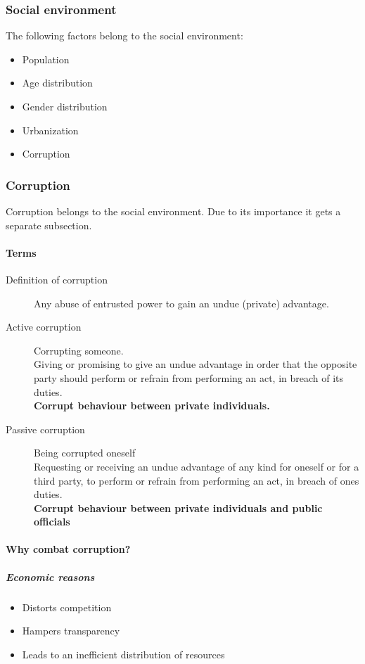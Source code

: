 \subsubsection{Social environment}
The following factors belong to the social environment:
\begin{itemize}
	\tightlist
	\item Population
	\item Age distribution
	\item Gender distribution
	\item Urbanization
	\item Corruption
\end{itemize}

\subsubsection{Corruption}
Corruption belongs to the social environment. Due to its importance it gets a separate subsection.
\paragraph{Terms}
\begin{description}
	\item[Definition of corruption] Any abuse of entrusted power to gain an undue (private) advantage.
	\item[Active corruption] Corrupting someone.\\
	Giving or promising to give an undue advantage in order that the opposite party should perform or refrain from performing an act, in breach of its duties.\\
	\textbf{Corrupt behaviour between private individuals.}
	\item[Passive corruption] Being corrupted oneself\\
	Requesting or receiving an undue advantage of any kind for oneself or for a third party, to perform or refrain from performing an act, in breach of ones duties.\\
	\textbf{Corrupt behaviour between private individuals and public officials}
\end{description}

\paragraph{Why combat corruption?}

\subparagraph{Economic reasons}
\begin{itemize}
	\tightlist
	\item Distorts competition
	\item Hampers transparency
	\item Leads to an inefficient distribution of resources
\end{itemize}

